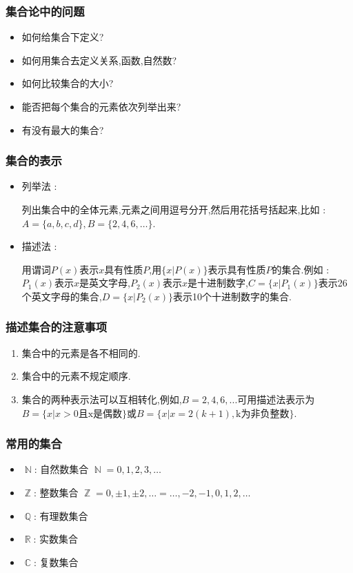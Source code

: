 \documentclass[UTF8,12pt]{ctexbook}
\DeclareMathOperator{\mathRealNumberCollection}{\mathbb{R}}
\DeclareMathOperator{\mathIntegerCollection}{\mathbb{Z}}
\DeclareMathOperator{\mathNatureNumberCollection}{\mathbb{N}}
\DeclareMathOperator{\mathRationalNumberCollection}{\mathbb{Q}}
\DeclareMathOperator{\mathComplexNumberCollection}{\mathbb{C}}
\begin{document}
{{{{\subsubsection{集合论中的问题}{
  \begin{itemize}
    \item 如何给集合下定义?
    \item 如何用集合去定义关系,函数,自然数?
    \item 如何比较集合的大小?
    \item 能否把每个集合的元素依次列举出来?
    \item 有没有最大的集合?
  \end{itemize}
}%

\subsubsection{集合的表示}{
  \begin{itemize}
    \item {
          列举法 :

          列出集合中的全体元素,元素之间用逗号分开,然后用花括号括起来,比如 : $A = \{a,b,c,d\},B = \{2,4,6,\dots\}$.
          }
    \item {
          描述法 :

          用谓词$P(x)$表示$x$具有性质$P$,用$\{x | P(x)\}$表示具有性质$P$的集合.例如 : $P_1(x)$表示$x$是英文字母,$P_2(x)$表示$x$是十进制数字,$C = \{x | P_1(x)\}$表示26个英文字母的集合,$D = \{x | P_2(x)\}$表示10个十进制数字的集合.
          }
  \end{itemize}
}%

\subsubsection{描述集合的注意事项}{
  \begin{enumerate}
    \item 集合中的元素是各不相同的.
    \item 集合中的元素不规定顺序.
    \item {
          集合的两种表示法可以互相转化,例如,$B={2,4,6,...}$可用描述法表示为$B=\{x|x>0\mbox{且x是偶数}\}$或$B=\{x|x=2(k+1),\mbox{k为非负整数}\}$.
          }
  \end{enumerate}
}%

\subsubsection{常用的集合}{
  \begin{itemize}
    \item $\mathNatureNumberCollection$: 自然数集合 $\mathNatureNumberCollection = {0,1,2,3,\dots}$
    \item $\mathIntegerCollection$: 整数集合 $\mathIntegerCollection = {0, \pm 1, \pm 2, \dots} = {\dots, -2, -1, 0, 1, 2, \dots}$
    \item $\mathRationalNumberCollection$: 有理数集合
    \item $\mathRealNumberCollection$: 实数集合
    \item $\mathComplexNumberCollection$: 复数集合
  \end{itemize}
}%

}}}}
\end{document}
